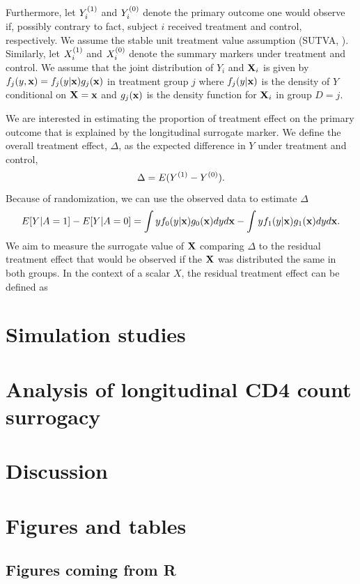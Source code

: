 \documentclass[useAMS,usenatbib,referee]{biom}
\begin{document}
Furthermore, let \(Y_i^{(1)}\) and \(Y_i^{(0)}\) denote the primary
outcome one would observe if, possibly contrary to fact, subject \(i\)
received treatment and control, respectively. We assume the stable unit
treatment value assumption (SUTVA, \citet{rosenbaum1983central}).
Similarly, let \(X_i^{(1)}\) and \(X_i^{(0)}\) denote the summary markers
under treatment and control. We assume that the joint distribution of
\(Y_i\) and \({\bf X}_i\) is given by \(f_j(y, {\bf x}) = f_j(y|{\bf x})g_j({\bf x})\)
in treatment group \(j\) where \(f_j(y|{\bf x})\) is the density of \(Y\)
conditional on \({\bf X} = {\bf x}\) and \(g_j({\bf x})\) is the density function
for \({\bf X}_i\) in group \(D = j\).

We are interested in estimating the proportion of treatment effect on
the primary outcome that is explained by the longitudinal surrogate
marker. We define the overall treatment effect, \(\Delta\), as the
expected difference in \(Y\) under treatment and control,
\[\Delta=E(Y^{(1)}-Y^{(0)}).\] Because of randomization, we can use the
observed data to estimate \(\Delta\)
\[E[Y | A = 1] - E[Y | A = 0] = \int y f_0(y|{\bf x})g_0({\bf x})dyd{\bf x} - \int y f_1(y|{\bf x})g_1({\bf x})dyd{\bf x}.\]
We aim to measure the surrogate value of \({\bf X}\) comparing \(\Delta\) to
the residual treatment effect that would be observed if the \({\bf X}\) was
distributed the same in both groups. In the context of a scalar \(X\),
the residual treatment effect can be defined as

\section{Simulation studies}\label{sec:2}

\section{Analysis of longitudinal CD4 count
surrogacy}\label{analysis-of-longitudinal-cd4-count-surrogacy}

\section{Discussion}\label{discussion}

\section{Figures and tables}\label{figures-and-tables}

\subsection{Figures coming from R}\label{figures-coming-from-r}
\end{document}
